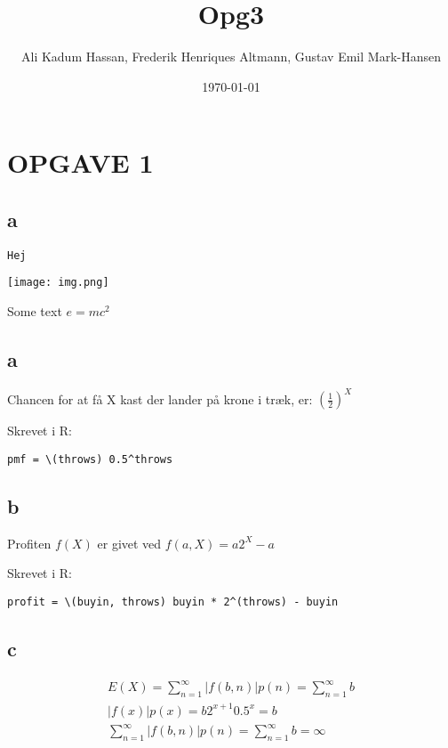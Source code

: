 \documentclass[11pt]{article}
\author{Ali Kadum Hassan, Frederik Henriques Altmann, Gustav Emil Mark-Hansen}
\date{\today}
\title{Opg3}
\begin{document}
\maketitle
\tableofcontents


\section{OPGAVE 1}
\label{sec:orgee43d00}

\subsection{a}
\label{sec:org707dbd0}
\begin{verbatim}
Hej
\end{verbatim}

\begin{center}
\texttt{[image: img.png]}
\end{center}

Some text
\(e = mc^2\)

\subsection{a}
\label{sec:org07c1859}
Chancen for at få X kast der lander på krone i træk, er:
\((\frac{1}{2})^X\)

Skrevet i R:
\begin{verbatim}
pmf = \(throws) 0.5^throws
\end{verbatim}
\subsection{b}
\label{sec:org828cae8}
Profiten \(f(X)\) er givet ved \(f(a, X) = a2^X - a\)

Skrevet i R:
\begin{verbatim}
profit = \(buyin, throws) buyin * 2^(throws) - buyin
\end{verbatim}
\subsection{c}
\label{sec:orge8c304f}
\begin{align}
E(X) = \sum_{n=1}^\infty |f(b,n)|p(n) = \sum_{n=1}^\infty b \\
|f(x)|p(x) = b2^{x+1}0.5^x = b \\
\sum_{n=1}^\infty |f(b,n)|p(n) = \sum_{n=1}^\infty b = \infty
\end{align}
\end{document}
